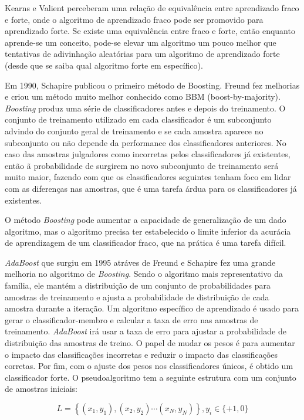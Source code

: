 Kearns e Valient perceberam uma relação de equivalência entre aprendizado fraco e forte, onde o algoritmo de aprendizado fraco pode ser promovido para aprendizado forte.
Se existe uma equivalência entre fraco e forte, então enquanto aprende-se um conceito, pode-se elevar um algoritmo um pouco melhor que tentativas de adivinhação aleatórias para um algoritmo de aprendizado forte (desde que se saiba qual algoritmo forte em específico).

Em 1990, Schapire publicou o primeiro método de Boosting. Freund fez melhorias e criou um método muito melhor conhecido como BBM (boost-by-majority).
\textit{Boosting} produz uma série de classificadores antes e depois do treinamento. O conjunto de treinamento utilizado em cada classificador é um subconjunto advindo do conjunto geral de treinamento e se cada amostra aparece no subconjunto ou não depende da performance dos classificadores anteriores. No caso das amostras julgadores como incorretas pelos classificadores já existentes, então ã probabilidade de surgirem no novo subconjunto de treinamento será muito maior, fazendo com que os classificadores seguintes tenham foco em lidar com as diferenças nas amostras, que é uma tarefa árdua para os classificadores já existentes.

O método \textit{Boosting} pode aumentar a capacidade de generalização de um dado algoritmo, mas o algoritmo precisa ter estabelecido o limite inferior da acurácia de aprendizagem de um classificador fraco, que na prática é uma tarefa difícil.

\textit{AdaBoost} que surgiu em 1995 atráves de Freund e Schapire fez uma grande melhoria no algoritmo de \textit{Boosting}.
Sendo o algoritmo mais representativo da família, ele mantém a distribuição de um conjunto de probabilidades para amostras de treinamento e ajusta a probabilidade de distribuição de cada amostra durante a iteração. Um algoritmo específico de aprendizado é usado para gerar o classificador-membro e calcular a taxa de erro nas amostras de treinamento. \textit{AdaBoost} irá usar a taxa de erro para ajustar a probabilidade de distribuição das amostras de treino. O papel de mudar os pesos é para aumentar o impacto das classificações incorretas e reduzir o impacto das classificações corretas. Por fim, com o ajuste dos pesos nos classificadores únicos, é obtido um classificador forte.
O pseudoalgoritmo tem a seguinte estrutura com um conjunto de amostras iniciais:

\begin{equation}
    L=\left\{\left(x_{1}, y_{1}\right),\left(x_{2}, y_{2}\right) \cdots\left(x_{N}, y_{N}\right)\right\}, y_{i} \in\{+1,0\}
\end{equation}


